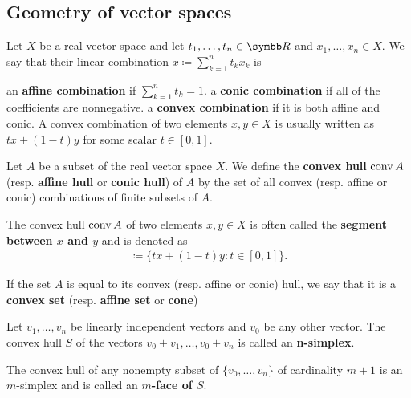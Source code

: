 \subsection{Geometry of vector spaces}\label{subsec:geometry_of_vector_spaces}

\begin{definition}\label{def:real_linear_combinations}
  Let \( X \) be a real vector space and let \( t_1, \ldots, t_n \in \BB{R} \) and \( x_1, \ldots, x_n \in X \). We say that their linear combination \( x \coloneqq \sum_{k=1}^n t_k x_k \) is

  \begin{defenum}
     an \textbf{affine combination} if \( \sum_{k=1}^n t_k = 1 \).
     a \textbf{conic combination} if all of the coefficients are nonnegative.
     a \textbf{convex combination} if it is both affine and conic. A convex combination of two elements \( x, y \in X \) is usually written as \( tx + (1-t)y \) for some scalar \( t \in [0, 1] \).
  \end{defenum}
\end{definition}

\begin{definition}\label{def:linear_combination_hulls}
  Let \( A \) be a subset of the real vector space \( X \). We define the \textbf{convex hull} \( \operatorname{conv} A \) (resp. \textbf{affine hull} or \textbf{conic hull}) of \( A \) by the set of all convex (resp. affine or conic) combinations of finite subsets of \( A \).

  The convex hull \( \operatorname{conv} A \) of two elements \( x, y \in X \) is often called the \textbf{segment between \( x \) and \( y \)} and is denoted as
  \begin{align*}
    [x, y] \coloneqq \{ tx + (1-t)y \colon t \in [0, 1] \}.
  \end{align*}

  If the set \( A \) is equal to its convex (resp. affine or conic) hull, we say that it is a \textbf{convex set} (resp. \textbf{affine set} or \textbf{cone})
\end{definition}

\begin{definition}\label{def:simplex}
  Let \( v_1, \ldots, v_n \) be linearly independent vectors and \( v_0 \) be any other vector. The convex hull \( S \) of the vectors \( v_0 + v_1, \ldots, v_0 + v_n \) is called an \textbf{n-simplex}.

  The convex hull of any nonempty subset of \( \{ v_0, \ldots, v_n \} \) of cardinality \( m + 1 \) is an \( m \)-simplex and is called an \textbf{\( m \)-face of \( S \)}.
\end{definition}
